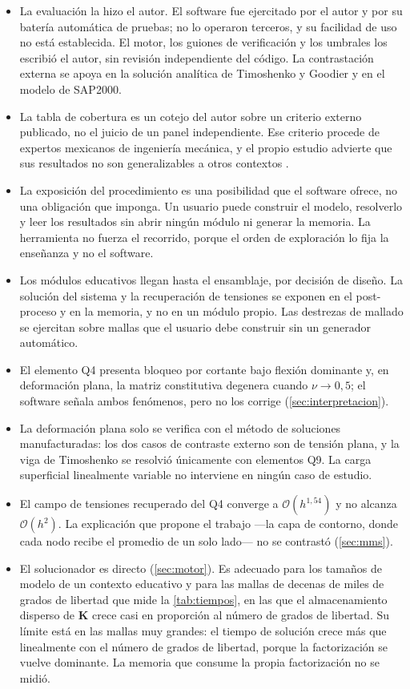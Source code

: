 \begin{itemize}
    \item La evaluación la hizo el autor. El software fue ejercitado por el autor y por su batería automática de pruebas; no lo operaron terceros, y su facilidad de uso no está establecida. El motor, los guiones de verificación y los umbrales los escribió el autor, sin revisión independiente del código. La contrastación externa se apoya en la solución analítica de Timoshenko y Goodier y en el modelo de SAP2000.
    \item La tabla de cobertura es un cotejo del autor sobre un criterio externo publicado, no el juicio de un panel independiente. Ese criterio procede de expertos mexicanos de ingeniería mecánica, y el propio estudio advierte que sus resultados no son generalizables a otros contextos \autocite[p.~1171]{perezsantiago2023fem}.
    \item La exposición del procedimiento es una posibilidad que el software ofrece, no una obligación que imponga. Un usuario puede construir el modelo, resolverlo y leer los resultados sin abrir ningún módulo ni generar la memoria. La herramienta no fuerza el recorrido, porque el orden de exploración lo fija la enseñanza y no el software.
    \item Los módulos educativos llegan hasta el ensamblaje, por decisión de diseño. La solución del sistema y la recuperación de tensiones se exponen en el post-proceso y en la memoria, y no en un módulo propio. Las destrezas de mallado se ejercitan sobre mallas que el usuario debe construir sin un generador automático.
    \item El elemento Q4 presenta bloqueo por cortante bajo flexión dominante y, en deformación plana, la matriz constitutiva degenera cuando $\nu \to 0{,}5$; el software señala ambos fenómenos, pero no los corrige (\autoref{sec:interpretacion}).
    \item La deformación plana solo se verifica con el método de soluciones manufacturadas: los dos casos de contraste externo son de tensión plana, y la viga de Timoshenko se resolvió únicamente con elementos Q9. La carga superficial linealmente variable no interviene en ningún caso de estudio.
    \item El campo de tensiones recuperado del Q4 converge a $\mathcal{O}(h^{1{,}54})$ y no alcanza $\mathcal{O}(h^{2})$. La explicación que propone el trabajo —la capa de contorno, donde cada nodo recibe el promedio de un solo lado— no se contrastó (\autoref{sec:mms}).
    \item El solucionador es directo (\autoref{sec:motor}). Es adecuado para los tamaños de modelo de un contexto educativo y para las mallas de decenas de miles de grados de libertad que mide la \autoref{tab:tiempos}, en las que el almacenamiento disperso de $\bm{K}$ crece casi en proporción al número de grados de libertad. Su límite está en las mallas muy grandes: el tiempo de solución crece más que linealmente con el número de grados de libertad, porque la factorización se vuelve dominante. La memoria que consume la propia factorización no se midió.
\end{itemize}

